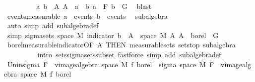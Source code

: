 \begin{isabellebody}
\ \ \ \ \ \ \isamarkupfalse%
\ \isamarkupfalse%
\ a\ b\ \ A{\isacharcolon}{\kern0pt}\ {\isachardoublequoteopen}A\ {\isacharequal}{\kern0pt}\ a\ {\isasyminter}\ b{\isachardoublequoteclose}\ {\isachardoublequoteopen}a\ {\isasymin}\ F{\isachardoublequoteclose}\ {\isachardoublequoteopen}b\ {\isasymin}\ G{\isachardoublequoteclose}\ \isamarkupfalse%
\ blast\isanewline
\isanewline
\ \ \ \ \ \ \isamarkupfalse%
\ events{\isacharbrackleft}{\kern0pt}measurable{\isacharbrackright}{\kern0pt}{\isacharcolon}{\kern0pt}\ {\isachardoublequoteopen}a\ {\isasymin}\ events{\isachardoublequoteclose}\ {\isachardoublequoteopen}b\ {\isasymin}\ events{\isachardoublequoteclose}\ \isamarkupfalse%
\ subalgebra\ \isamarkupfalse%
\ {\isacharparenleft}{\kern0pt}auto\ simp\ add{\isacharcolon}{\kern0pt}\ subalgebra{\isacharunderscore}{\kern0pt}def{\isacharparenright}{\kern0pt}\isanewline
\isanewline
\ \ \ \ \ \ \isamarkupfalse%
\ {\isacharbrackleft}{\kern0pt}simp{\isacharbrackright}{\kern0pt}{\isacharcolon}{\kern0pt}\ {\isachardoublequoteopen}sigma{\isacharunderscore}{\kern0pt}sets\ {\isacharparenleft}{\kern0pt}space\ M{\isacharparenright}{\kern0pt}\ {\isacharbraceleft}{\kern0pt}indicator\ b\ {\isacharminus}{\kern0pt}{\isacharbackquote}{\kern0pt}\ A\ {\isasyminter}\ space\ M\ {\isacharbar}{\kern0pt}A{\isachardot}{\kern0pt}\ A\ {\isasymin}\ borel{\isacharbraceright}{\kern0pt}\ {\isasymsubseteq}\ G{\isachardoublequoteclose}\isanewline
\ \ \ \ \ \ \ \ \isamarkupfalse%
\ borel{\isacharunderscore}{\kern0pt}measurable{\isacharunderscore}{\kern0pt}indicator{\isacharbrackleft}{\kern0pt}OF\ A{\isacharparenleft}{\kern0pt}{}{\isacharparenright}{\kern0pt}{\isacharcomma}{\kern0pt}\ THEN\ measurable{\isacharunderscore}{\kern0pt}sets{\isacharbrackright}{\kern0pt}\ sets{\isachardot}{\kern0pt}top\ subalgebra\isanewline
\ \ \ \ \ \ \ \ \isamarkupfalse%
\ {\isacharparenleft}{\kern0pt}intro\ sets{\isachardot}{\kern0pt}sigma{\isacharunderscore}{\kern0pt}sets{\isacharunderscore}{\kern0pt}subset{\isacharprime}{\kern0pt}{\isacharparenright}{\kern0pt}\ {\isacharparenleft}{\kern0pt}fastforce\ simp\ add{\isacharcolon}{\kern0pt}\ subalgebra{\isacharunderscore}{\kern0pt}def{\isacharparenright}{\kern0pt}{\isacharplus}{\kern0pt}\isanewline
\isanewline
\ \ \ \ \ \ \isamarkupfalse%
\ Un{\isacharunderscore}{\kern0pt}in{\isacharunderscore}{\kern0pt}sigma{\isacharcolon}{\kern0pt}\ {\isachardoublequoteopen}F\ {\isasymunion}\ vimage{\isacharunderscore}{\kern0pt}algebra\ {\isacharparenleft}{\kern0pt}space\ M{\isacharparenright}{\kern0pt}\ f\ borel\ {\isasymsubseteq}\ sigma\ {\isacharparenleft}{\kern0pt}space\ M{\isacharparenright}{\kern0pt}\ {\isacharparenleft}{\kern0pt}F\ {\isasymunion}\ vimage{\isacharunderscore}{\kern0pt}algebra\ {\isacharparenleft}{\kern0pt}space\ M{\isacharparenright}{\kern0pt}\ f\ borel{\isacharparenright}{\kern0pt}{\isachardoublequoteclose}\ \isamarkupfalse%

\end{isabellebody}
